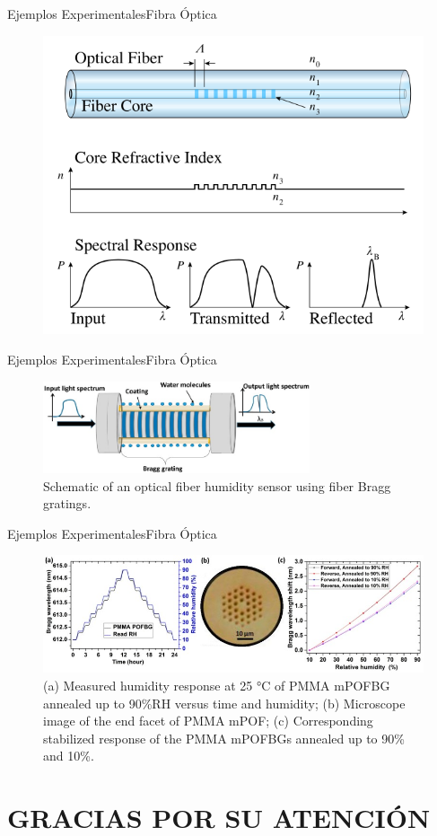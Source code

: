 \documentclass[]{beamer}
\begin{document}
\begin{frame}{Ejemplos Experimentales}{Fibra Óptica}
  \begin{figure}
    \includegraphics[height=0.7\textheight]{Docs/exp2}
    \caption{}
    \label{}
  \end{figure}

\end{frame}

\begin{frame}{Ejemplos Experimentales}{Fibra Óptica}
  \begin{figure}
    \includegraphics[width=0.7\textwidth]{Docs/exp3}
    \caption{Schematic of an optical fiber humidity sensor using fiber Bragg gratings.}
    \label{}
  \end{figure}

\end{frame}

\begin{frame}{Ejemplos Experimentales}{Fibra Óptica}
  \begin{figure}
    \includegraphics[width=\textwidth]{Docs/exp4}
    \caption{(a) Measured humidity response at 25 °C of PMMA mPOFBG annealed up to 90\%RH versus time and humidity; (b) Microscope image of the end facet of PMMA mPOF; (c) Corresponding stabilized response of the PMMA mPOFBGs annealed up to 90\% and 10\%.}
    \label{}
  \end{figure}

\end{frame}

\section{GRACIAS POR SU ATENCIÓN}
\end{document}
